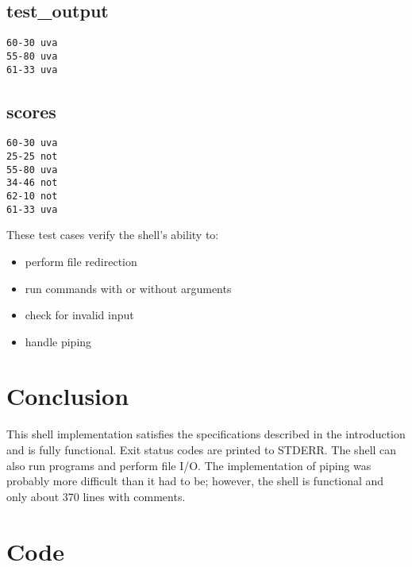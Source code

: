 \documentclass[12pt,letter,titlepage]{article}
\begin{document}
\subsection*{test\_output}{
\scriptsize{
\begin{verbatim}
60-30 uva
55-80 uva
61-33 uva
\end{verbatim}
}
}
\subsection*{scores}{
\scriptsize{
\begin{verbatim}
60-30 uva
25-25 not
55-80 uva
34-46 not
62-10 not
61-33 uva
\end{verbatim}
}
}
These test cases verify the shell's ability to:
\begin{itemize}
\item perform file redirection
\item run commands with or without arguments
\item check for invalid input
\item handle piping
\end{itemize}

\section*{Conclusion}
This shell implementation satisfies the specifications described in the introduction and is fully functional. Exit status codes are printed to STDERR. The shell can also run programs and perform file I/O. The implementation of piping was probably more difficult than it had to be; however, the shell is functional and only about 370 lines with comments.


\pagebreak
\section*{Code}
\end{document}
